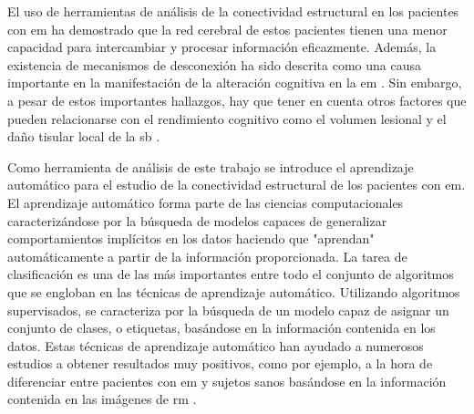 El uso de herramientas de análisis de la conectividad estructural en los pacientes con \gls{em} ha demostrado que la red cerebral de estos pacientes tienen una menor capacidad para intercambiar y procesar información eficazmente. Además, la existencia de mecanismos de desconexión ha sido descrita como una causa importante en la manifestación de la alteración cognitiva en la \gls{em} \cite{Shu2011DiffusionSclerosis} \cite{Llufriu2017StructuralSclerosis} \cite{Bozzali2013AnatomicalSclerosis} \cite{Louapre2014BrainStudy} \cite{Dineen2009DisconnectionSclerosis}. Sin embargo, a pesar de estos importantes hallazgos, hay que tener en cuenta otros factores que pueden relacionarse con el rendimiento cognitivo como el volumen lesional y el daño tisular local de la \gls{sb} \cite{Stellmann2017ReducedMS} \cite{Ouellette2018LesionSclerosis.}. 

Como herramienta de análisis de este trabajo se introduce el aprendizaje automático para el estudio de la conectividad estructural de los pacientes con \gls{em}. El aprendizaje automático forma parte de las ciencias computacionales caracterizándose por la búsqueda de modelos capaces de generalizar comportamientos implícitos en los datos haciendo que "aprendan" automáticamente a partir de la información proporcionada. La tarea de clasificación es una de las más importantes entre todo el conjunto de algoritmos que se engloban en las técnicas de aprendizaje automático. Utilizando algoritmos supervisados, se caracteriza por la búsqueda de un modelo capaz de asignar un conjunto de clases, o etiquetas, basándose en la información contenida en los datos. Estas técnicas de aprendizaje automático han ayudado a numerosos estudios a obtener resultados muy positivos, como por ejemplo, a la hora de diferenciar entre pacientes con \gls{em} y sujetos sanos basándose en la información contenida en las imágenes de \gls{rm} \cite{Zhang2016ComparisonMachine}.
